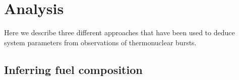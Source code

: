 \documentclass{aastex61}
\newcommand\aastex{AAS\TeX}
\begin{document}
%
%
%
%
%
%
%
%

\section{Analysis} 
\label{sec:analysis}

Here we describe three different approaches that have been used to deduce system parameters from observations of thermonuclear bursts.

\subsection{Inferring fuel composition} 
\label{subsec:fuelcomp}
\end{document}
